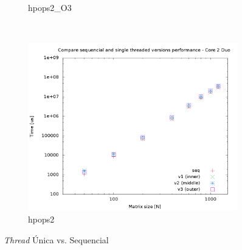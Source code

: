 \documentclass[a4paper, 12pt]{article}
\begin{document}
\begin{figure}[H]
\begin{subfigure}[H]{0.5\textwidth}
        \caption{hpops2\_O3}
        \label{fig:hpops2_O3_cmp_single}
    \end{subfigure}
    ~ %
    \begin{subfigure}[H]{0.5\textwidth}
        \includegraphics[width=\textwidth]{cmp_single_thread_hpops2}
        \caption{hpops2}
        \label{fig:hpops2_cmp_single}
    \end{subfigure}
    \caption{\textit{Thread} Única vs. Sequencial}\label{fig:animals}
\end{figure}

\newpage
\end{document}
